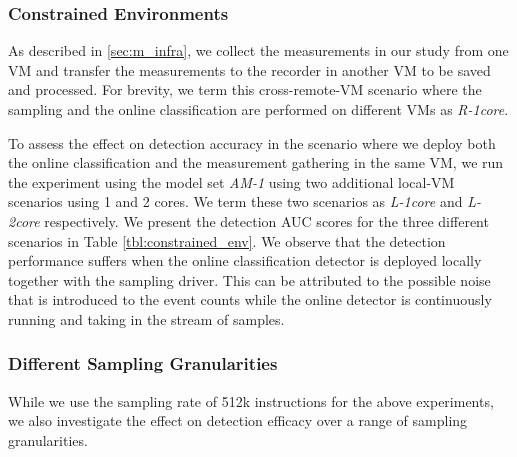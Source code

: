 \documentclass{acm_proc_article-sp}
\begin{document}
\subsubsection{Constrained Environments}
As described in \ref{sec:m_infra}, we collect the measurements in our study from one VM and transfer the measurements to the recorder in another VM to be saved and processed. For brevity, we term this cross-remote-VM scenario where the sampling and the online classification are performed on different VMs as \textit{R-1core}.

To assess the effect on detection accuracy in the scenario where we deploy both the online classification and the measurement gathering in the same VM, we run the experiment using the model set \textit{AM-1} using two additional local-VM scenarios using 1 and 2 cores. We term these two scenarios as \textit{L-1core} and \textit{L-2core} respectively. We present the detection AUC scores for the three different scenarios in Table \ref{tbl:constrained_env}. We observe that the detection performance suffers when the online classification detector is deployed locally together with the sampling driver. This can be attributed to the possible noise that is introduced to the event counts while the online detector is continuously running and taking in the stream of samples.

\begin{table}
\caption{AUC scores for constrained scenarios using set \textit{AM-1}.}
\label{tbl:constrained_env}
\end{table}



\subsubsection{Different Sampling Granularities}
\label{sec:sampling_overhead}
While we use the sampling rate of 512k instructions for the above experiments, we also investigate the effect on detection efficacy over a range of sampling granularities.
\end{document}

